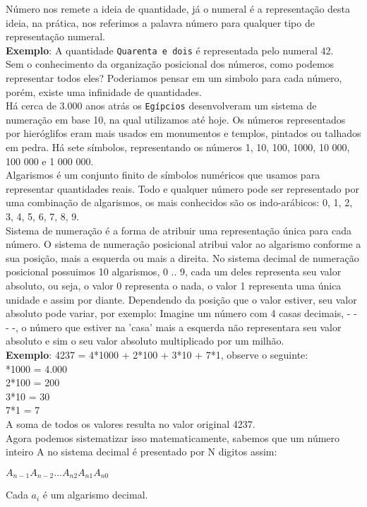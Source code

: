 \documentclass[12pt, onecolumn]{article}
\begin{document}
	Número nos remete a ideia de quantidade, já o numeral é a representação desta 
	ideia, na prática, nos referimos a palavra número para qualquer tipo de
	representação numeral.\\
	\newline
	\textbf{Exemplo}: A quantidade \texttt{Quarenta e dois} é representada pelo
	numeral 42.\\
	\newline
	Sem o conhecimento da organização posicional dos números, como podemos
	representar todos eles? Poderiamos pensar em um simbolo para cada número,
	porém, existe uma infinidade de quantidades.\\
	\newline
	Há cerca de 3.000 anos atrás os \texttt{Egípcios} desenvolveram um sistema
	de numeração em base 10, na qual utilizamos até hoje. Os números representados por 
	hieróglifos eram mais usados em monumentos e templos, pintados ou 
	talhados em pedra. Há sete símbolos, representando os números 
	1, 10, 100, 1000, 10 000, 100 000 e 1 000 000.\citep{art3}\\
	\newline
	Algarismos é um conjunto finito de símbolos numéricos que usamos para
	representar quantidades reais. Todo e qualquer número pode ser representado
	por uma combinação de algarismos, os mais conhecidos são os indo-arábicos:
	0, 1, 2, 3, 4, 5, 6, 7, 8, 9.\\
	\newline
	Sistema de numeração é a forma de atribuir uma representação única para cada
	número. O sistema de numeração posicional atribui valor ao algarismo conforme
	a sua posição, mais a esquerda ou mais a direita.
	\newline
	No sistema decimal de numeração posicional possuimos 10 algarismos, 0 .. 9,
	cada um deles representa seu valor absoluto, ou seja, o valor 0 representa
	o nada, o valor 1 representa uma única unidade e assim por diante. Dependendo
	da posição que o valor estiver, seu valor absoluto pode variar, por exemplo:
	Imagine um número com 4 casas decimais, - - - -, o número que estiver na 
	'casa' mais a esquerda não representara seu valor absoluto e sim o seu valor
	absoluto multiplicado por um milhão.\\
	\newline
	\textbf{Exemplo}: 4237 = 4*1000 + 2*100 + 3*10 + 7*1, observe o seguinte:\\
	*1000 	= 4.000\\
	2*100 	= 200\\
	3*10	= 30\\
	7*1	= 7\\
	\newline
	A soma de todos os valores resulta no valor original 4237.\\
	\newline
	Agora podemos sistematizar isso matematicamente, sabemos que um número
	inteiro A no sistema decimal é presentado por N digitos assim:\\
	\begin{center}
		$A_{n-1} A_{n-2} ... A_{n2} A_{n1} A_{n0}$
	\end{center}
	Cada $a_{i}$ é um algarismo decimal.
\end{document}
